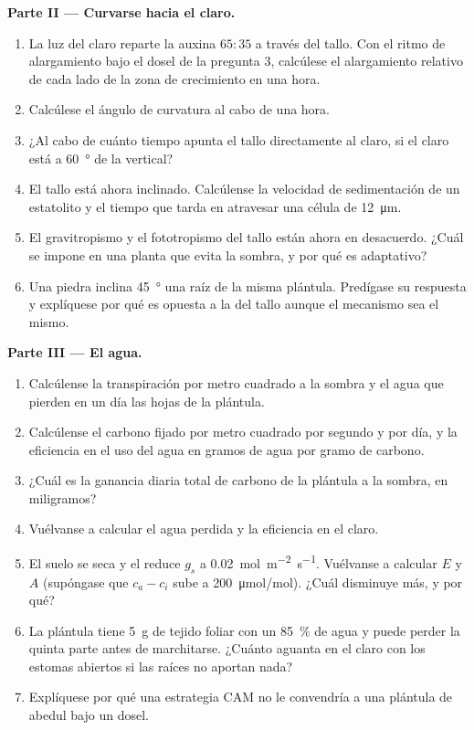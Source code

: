 \begin{problem}
\medskip
\noindent\textbf{Parte II --- Curvarse hacia el claro.}
\begin{enumerate}[resume]
  \item La luz del claro reparte la auxina $65 : 35$ a través del tallo. Con
        el ritmo de alargamiento bajo el dosel de la pregunta 3, calcúlese
        el alargamiento relativo de cada lado de la zona de crecimiento en
        una hora.
  \item Calcúlese el ángulo de curvatura al cabo de una hora.
  \item ¿Al cabo de cuánto tiempo apunta el tallo directamente al claro,
        si el claro está a \qty{60}{\degree} de la vertical?
  \item El tallo está ahora inclinado. Calcúlense la velocidad de
        sedimentación de un estatolito y el tiempo que tarda en atravesar
        una célula de \qty{12}{\micro m}.
  \item El gravitropismo y el fototropismo del tallo están ahora en
        desacuerdo. ¿Cuál se impone en una planta que evita la sombra, y
        por qué es adaptativo?
  \item Una piedra inclina \qty{45}{\degree} una raíz de la misma
        plántula. Predígase su respuesta y explíquese por qué es opuesta a
        la del tallo aunque el mecanismo sea el mismo.
\end{enumerate}

\medskip
\noindent\textbf{Parte III --- El agua.}
\begin{enumerate}[resume]
  \item Calcúlense la transpiración por metro cuadrado a la sombra y el
        agua que pierden en un día las hojas de la plántula.
  \item Calcúlense el carbono fijado por metro cuadrado por segundo y por
        día, y la eficiencia en el uso del agua en gramos de agua por
        gramo de carbono.
  \item ¿Cuál es la ganancia diaria total de carbono de la plántula a la
        sombra, en miligramos?
  \item Vuélvanse a calcular el agua perdida y la eficiencia en el claro.
  \item El suelo se seca y el  reduce $g_s$ a
        \qty{0.02}{mol.m^{-2}.s^{-1}}. Vuélvanse a calcular $E$ y $A$
        (supóngase que $c_a - c_i$ sube a \qty{200}{\micro mol/mol}).
        ¿Cuál disminuye más, y por qué?
  \item La plántula tiene \qty{5}{g} de tejido foliar con un \qty{85}{\%}
        de agua y puede perder la quinta parte antes de marchitarse.
        ¿Cuánto aguanta en el claro con los estomas abiertos si las raíces
        no aportan nada?
  \item Explíquese por qué una estrategia CAM no le convendría a una
        plántula de abedul bajo un dosel.
\end{enumerate}


\end{problem}
